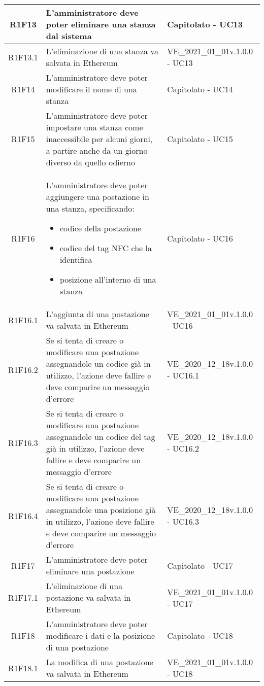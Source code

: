 \begin{center}
\begin{longtable}{|c|p{10cm}|p{4cm}|}
		R1F13&L'amministratore deve poter eliminare una stanza dal sistema	& Capitolato - UC13	\\
		\hline
		R1F13.1&L'eliminazione di una stanza va salvata in Ethereum	& VE\_2021\_01\_01v.1.0.0 - UC13	\\
		\hline
		R1F14&L'amministratore deve poter modificare il nome di una stanza	& Capitolato - UC14	\\
		\hline
		R1F15&L'amministratore deve poter impostare una stanza come inaccessibile per alcuni giorni, a partire anche da un giorno diverso da quello odierno	& Capitolato - UC15	\\
		\hline
		R1F16&L'amministratore deve poter aggiungere una postazione in una stanza, specificando:
		\begin{itemize}
			\item codice della postazione
			\item codice del tag NFC che la identifica
			\item posizione all'interno di una stanza
		\end{itemize} & Capitolato - UC16	\\
		\hline
		R1F16.1&L'aggiunta di una postazione va salvata in Ethereum	&VE\_2021\_01\_01v.1.0.0 - UC16 	\\
		\hline
		R1F16.2&	Se si tenta di creare o modificare una postazione assegnandole un codice già in utilizzo, l'azione deve fallire e deve comparire un messaggio d'errore& VE\_2020\_12\_18v.1.0.0 - UC16.1 	\\
		\hline
		R1F16.3&Se si tenta di creare o modificare una postazione assegnandole un codice del tag già in utilizzo, l'azione deve fallire e deve comparire un messaggio d'errore	&VE\_2020\_12\_18v.1.0.0 - UC16.2 	\\
		\hline
		R1F16.4&Se si tenta di creare o modificare una postazione assegnandole una posizione già in utilizzo, l'azione deve fallire e deve comparire un messaggio d'errore	&VE\_2020\_12\_18v.1.0.0 - UC16.3 	\\
		\hline
		R1F17&L'amministratore deve poter eliminare una postazione	& Capitolato - UC17	\\
		\hline
		R1F17.1	&L'eliminazione di una postazione va salvata in Ethereum	& VE\_2021\_01\_01v.1.0.0 - UC17	\\
		\hline
		R1F18&L'amministratore deve poter modificare i dati e la posizione di una postazione	& Capitolato - UC18	\\
		\hline
		R1F18.1&	La modifica di una postazione va salvata in Ethereum& VE\_2021\_01\_01v.1.0.0 - UC18	\\
		\hline
		

\end{longtable}
\end{center}
